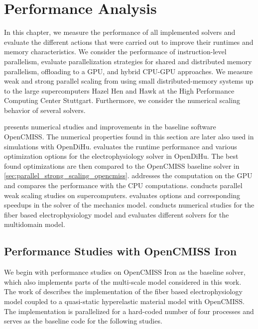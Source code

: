 

\chapter{Performance Analysis}\label{sec:performance_analysis}

In this chapter, we measure the performance of all implemented solvers and evaluate the different actions that were carried out to improve their runtimes and memory characteristics.
We consider the performance of instruction-level parallelism, evaluate parallelization strategies for shared and distributed memory parallelism, offloading to a GPU, and hybrid CPU-GPU  approaches. We measure weak and strong parallel scaling from using small distributed-memory systems up to the large supercomputers Hazel Hen and Hawk at the High Performance Computing Center Stuttgart. Furthermore, we consider the numerical scaling behavior of several solvers.

 presents numerical studies and improvements in the baseline software OpenCMISS. The numerical properties found in this section are later also used in simulations with OpenDiHu.  evaluates the runtime performance and various optimization options for the electrophysiology solver in OpenDiHu. The best found optimizations are then compared to the OpenCMISS baseline solver in \cref{sec:parallel_strong_scaling_opencmiss}.
 addresses the computation on the GPU and compares the performance with the CPU computations.
 conducts parallel weak scaling studies on supercomputers.
 evaluates options and corresponding speedups in the solver of the mechanics model.
 conducts numerical studies for the fiber based electrophysiology model and evaluates different solvers for the multidomain model.

\section{Performance Studies with OpenCMISS Iron}\label{sec:performance_opencmiss_iron}

We begin with performance studies on OpenCMISS Iron as the baseline solver, which also implements parts of the multi-scale model considered in this work. The work of \cite{Heidlauf2013} describes the implementation of the fiber based electrophysiology model coupled to a quasi-static hyperelastic material model with OpenCMISS. The implementation is parallelized for a hard-coded number of four processes and serves as the baseline code for the following studies.

